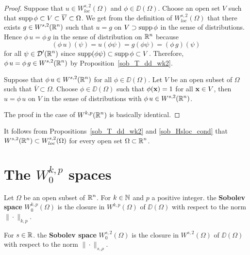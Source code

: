 \begin{proof}
Suppose that $\displaystyle u \in W^{s,2}_{loc}(\Omega)$ and
$\phi \in \DD(\Omega)$.  Choose an open set $V$ such that
$\displaystyle \operatorname{supp} \phi \subset V \subset \overline{V}\subset \Omega$.
We get from the definition of $\displaystyle W^{s,2}_{loc}(\Omega)$
that there exists $\displaystyle g\in W^{s,2}(\mathbb{R}^n)$ such that $u=g$ on
$V \supset \operatorname{supp} \phi$ in the sense of distributions.  Hence
$\phi\, u = \phi \, g$ in the sense of distribution on $\mathbb{R}^n$ because
\[
  (\phi \, u)(\psi) = u(\phi\psi) = g(\phi\psi) = (\phi\,g)(\psi)
\]
for all $\displaystyle \psi \in \mathcal{D}'(\mathbb{R}^n)$ since
$\operatorname{supp}(\phi\psi) \subset \operatorname{supp}
\phi \subset V$.  Therefore,
$\displaystyle \phi\, u = \phi \, g \in W^{s,2}(\mathbb{R}^n)$ by
Proposition~\ref{sob_T_dd_wk2}.

Suppose that $\displaystyle \phi\,u \in W^{s,2}(\mathbb{R}^n)$ for all
$\displaystyle \phi\in \DD(\Omega)$.  Let $V$ be an open
subset of $\Omega$ such that $\overline{V}\subset \Omega$.  Choose
$\displaystyle \phi \in \DD(\Omega)$ such that $\phi(\mathbf{x})=1$ for all
$\mathbf{x} \in V$, then $u = \phi \, u$ on $V$ in the sense of
distributions with $\displaystyle \phi \, u \in W^{s,2}(\mathbb{R}^n)$.

 The proof in the case of $\displaystyle W^{k,p}(\mathbb{R}^n)$ is
basically identical.
\end{proof}

It follows from Propositions~\ref{sob_T_dd_wk2} and
\ref{sob_Hsloc_cond} that
$\displaystyle W^{s,2}(\mathbb{R}^n) \subset W^{s,2}_{loc}(\Omega)$
for every open set $\displaystyle \Omega \subset \mathbb{R}^n$.

\section{The $\displaystyle W^{k,p}_0$ spaces}

\begin{defn}
Let $\Omega$ be an open subset of $\displaystyle \mathbb{R}^n$.
For $k\in \mathbb{N}$ and $p$ a positive integer. the
{\bfseries Sobolev space}
$\displaystyle W^{k,p}_0(\Omega)$ is the closure in 
$\displaystyle W^{k,p}(\Omega)$ of $\DD(\Omega)$ with respect to the norm
$\|\cdot\|_{k,p}$.

For $s \in \mathbb{R}$. the
{\bfseries Sobolev space}
$\displaystyle W^{s,2}_0(\Omega)$ is the closure in 
$\displaystyle W^{s,2}(\Omega)$ of $\DD(\Omega)$ with respect to the norm
$\|\cdot\|_{s,\rho}$.
\end{defn}

